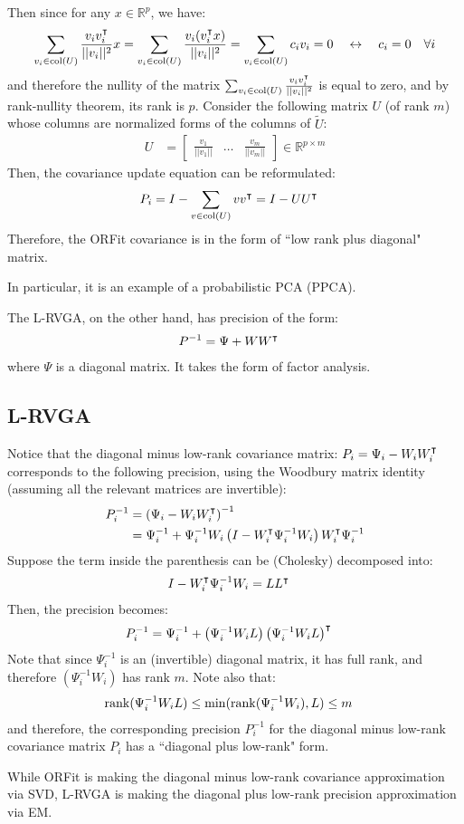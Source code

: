 Then since for any $x \in \mathbb{R}^{p}$, we have:
\begin{align}
    \sum_{v_i \in \text{col}(U)} \frac{v_i v_i^{\intercal}}{||v_i||^2} x = \sum_{v_i \in \text{col}(U)} \frac{v_i (v_i^{\intercal} x)}{||v_i||^2} =
    \sum_{v_i \in \text{col}(U)} c_i v_i = 0 \quad \leftrightarrow \quad c_i = 0 \quad \forall i
\end{align}
and therefore the nullity of the matrix $\sum_{v_i \in \text{col}(U)} \frac{v_i v_i^{\intercal}}{||v_i||^2}$ is equal to zero,
and by rank-nullity theorem, its rank is $p$.
Consider the following matrix $U$ (of rank $m$) whose columns are normalized forms of the columns of $\tilde{U}$:
\begin{align}
    U &= \begin{bmatrix} \frac{v_1}{||v_1||} & \dots & \frac{v_m}{||v_m||} \end{bmatrix} \in \mathbb{R}^{p \times m}
\end{align}
Then, the covariance update equation can be reformulated:
\begin{align}
    P_i &= I - \sum_{v \in \text{col}(U)}v v^{\intercal} = I - U U^{\intercal}
\end{align}
Therefore, the ORFit covariance is in the form of
``low rank plus diagonal" matrix.

In particular, it is an example of a probabilistic PCA (PPCA).

The L-RVGA, on the other hand, has precision of the form:
\begin{align}
    P^{-1} &= \Psi + WW^{\intercal}
\end{align}
where $\Psi$ is a diagonal matrix. It takes the form of
factor analysis.

\subsection{L-RVGA}
Notice that the diagonal minus low-rank covariance matrix: $P_{i} = \Psi_i - W_i W_i^{\intercal}$ corresponds to
the following precision, using the Woodbury matrix identity (assuming all the relevant
matrices are invertible):
\begin{align}
    P_i^{-1} &= \left( \Psi_i - W_i W_i^{\intercal} \right)^{-1} \\
    &= \Psi_i^{-1} + \Psi_i^{-1} W_i 
    \left( I - W_i^{\intercal} \Psi_i^{-1} W_i \right) W_i^{\intercal} \Psi_i^{-1}
\end{align}
Suppose the term inside the parenthesis can be (Cholesky) decomposed into:
\begin{align}
    I - W_i^{\intercal} \Psi_i^{-1} W_i &= LL^{\intercal}
\end{align}
Then, the precision becomes:
\begin{align}
    P_i^{-1} &= \Psi_i^{-1} + \left( \Psi_i^{-1} W_i L \right) \left( \Psi_i^{-1} W_i L \right)^{\intercal}
\end{align}
Note that since $\Psi_i^{-1}$ is an (invertible) diagonal
matrix, it has full rank, and therefore $(\Psi_i^{-1}W_i)$ has rank $m$. Note also that:
\begin{align}
    \mathrm{rank}(\Psi_i^{-1} W_i L) &\leq \min(\mathrm{rank}(\Psi_i^{-1} W_i), L) \leq m
\end{align}
and therefore, the corresponding precision $P_i^{-1}$ for the diagonal minus low-rank covariance matrix $P_i$
has a ``diagonal plus low-rank" form.

While ORFit is making the diagonal minus low-rank covariance approximation via SVD, 
L-RVGA is making the diagonal plus low-rank precision approximation via EM.

